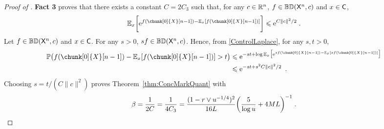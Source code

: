 \documentclass[leqno,11pt,a4paper]{article}
\begin{document}
\begin{proof}[Proof of ]
\noindent
{\bf Fact 3} proves that there exists a constant $C=2C_3$ such that, for any $c\in \mathbb{R}^n$, $f\in \mathbb{BD}(\mathsf{X}^n,c)$ and $x\in \mathsf{C}$,
\begin{equation}\label{ControlLaplace}
 \Ebb_x\bigg[\rme^{f(\chunk[0]{X}[n-1])-\Ebb_x[f(\chunk[0]{X}[n-1])]}\bigg]\leqslant \rme^{C\| c\|^2/2}
\eqsp .
\end{equation}
Let $f\in \mathbb{BD}(\mathsf{X}^n,c)$ and $x\in \mathsf{C}$. 
For any $s>0$, $sf\in \mathbb{BD}(\mathsf{X}^n,c)$.
Hence, from \eqref{ControlLaplace}, for any $s,t>0$,
\begin{align*}
 \Pbb\big(f(\chunk[0]{X}[n-1])-\Ebb_x[f(\chunk[0]{X}[n-1])]>t\big)&\leqslant \rme^{-st+\log\Ebb_x\big[\rme^{sf(\chunk[0]{X}[n-1])-\Ebb_x[sf(\chunk[0]{X}[n-1])]}\big]}\\
 &\leqslant \rme^{-st+s^2C\| c\|^2/2}\enspace.
\end{align*}
Choosing $s=t/(C\|c\|^2)$ proves Theorem~\ref{thm:ConcMarkQuant} with
\[
\beta=\frac1{2C}=\frac1{4C_3}=\frac{(1-r\vee u^{-1/4})^2}{16L}\bigg(\frac5{\log u}+4ML\bigg)^{-1}\;.
\]
\end{proof}




\end{document}
